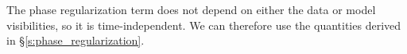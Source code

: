 \documentclass{article}
\newcommand\re{\operatorname{Re}}
\begin{document}
The phase regularization term does not depend on either the data or model visibilities, so it is time-independent. We can therefore use the quantities derived in \S\ref{s:phase_regularization}.


\begin{comment}
\section{Direction-Dependent Calibration}

For direction-dependent calibration, we replace the model visiblities $m_{jk} \rightarrow m_{jk}^\text{const} + \sum_l A_l m_{jk}^{(l)}$. Here $l$ indexes the directions to solve for. $A_l$ is the real-valued amplitude in those directions. We then get a $\chi$-squared of the form
\begin{equation}
    \chi^2(\boldsymbol{g}, \boldsymbol{A}) = \sum_{jk} \frac{1}{\sigma_{jk}^2} \left| m_{jk}^\text{const} + \sum_l A_l m_{jk}^{(l)} - g_j g_k^* v_{jk} \right|^2.
\end{equation}

Taking derivatives gives
\begin{equation}
    \frac{\partial \chi^2(\boldsymbol{g}, \boldsymbol{A})}{\partial A_{l'}} = \sum_{jk} \frac{2}{\sigma_{jk}^2} \re \left[ \left(m_{jk}^{(l')}\right)^* \left( m_{jk}^\text{const} + \sum_l A_l m_{jk}^{(l)} - g_j g_k^* v_{jk} \right) \right]
\end{equation}
and
\begin{equation}
    \frac{\partial^2 \chi^2(\boldsymbol{g}, \boldsymbol{A})}{\partial A_{l'} \partial A_{l''}} = \sum_{jk} \frac{2}{\sigma_{jk}^2} \re \left[ \left(m_{jk}^{(l')}\right)^* m_{jk}^{(l'')} \right].
\end{equation}


\section{Including Polarization}

We can now include polarization, such that we use all the visibility polarizations ($pp$, $qq$, $pq$, and $qp$) in calibration. Here we do not calibrate the crosspol gains. We continue to exclude autocorrelations in calibration and calibrate each frequency independently. Here we once again assume a single time step.

\subsection{Cost Function}


\end{comment}
\end{document}
